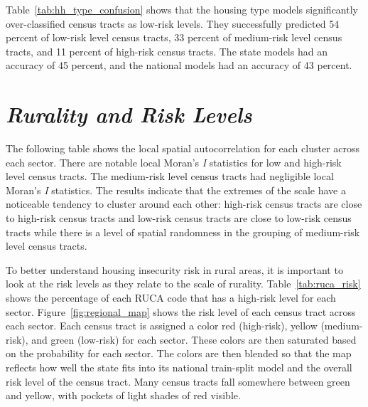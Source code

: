 

Table~\ref{tab:hh_type_confusion} shows that the housing type models significantly over-classified census tracts as low-risk levels. They successfully predicted 54 percent of low-risk level census tracts, 33 percent of medium-risk level census tracts, and 11 percent of high-risk census tracts. The state models had an accuracy of 45 percent, and the national models had an accuracy of 43 percent. 



\section{\textit{Rurality and Risk Levels}}

The following table shows the local spatial autocorrelation for each cluster across each sector. There are notable local Moran's \textit{I} statistics for low and high-risk level census tracts. The medium-risk level census tracts had negligible local Moran's \textit{I} statistics. The results indicate that the extremes of the scale have a noticeable tendency to cluster around each other: high-risk census tracts are close to high-risk census tracts and low-risk census tracts are close to low-risk census tracts while there is a level of spatial randomness in the grouping of medium-risk level census tracts. 



To better understand housing insecurity risk in rural areas, it is important to look at the risk levels as they relate to the scale of rurality. Table~\ref{tab:ruca_risk} shows the percentage of each RUCA code that has a high-risk level for each sector.  Figure~\ref{fig:regional_map} shows the risk level of each census tract across each sector. Each census tract is assigned a color red (high-risk), yellow (medium-risk), and green (low-risk) for each sector. These colors are then saturated based on the probability for each sector. The colors are then blended so that the map reflects how well the state fits into its national train-split model and the overall risk level of the census tract. Many census tracts fall somewhere between green and yellow, with pockets of light shades of red visible. 






